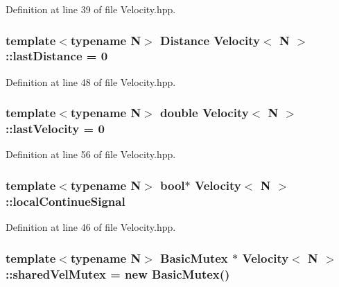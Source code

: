Definition at line 39 of file Velocity.\-hpp.

\hypertarget{struct_velocity_a4a65b272ce588eab6a9a9fa1fdb94a01}{
\subsubsection[{last\-Distance}]{\setlength{\rightskip}{0pt plus 5cm}template$<$typename N$>$ {\bf Distance} {\bf Velocity}$<$ N $>$\-::last\-Distance = 0\hspace{0.3cm}{\ttfamily [protected]}}}\label{struct_velocity_a4a65b272ce588eab6a9a9fa1fdb94a01}


Definition at line 48 of file Velocity.\-hpp.

\hypertarget{struct_velocity_acb312e3b7523314efd771a52fe8f2982}{
\subsubsection[{last\-Velocity}]{\setlength{\rightskip}{0pt plus 5cm}template$<$typename N$>$ double {\bf Velocity}$<$ N $>$\-::last\-Velocity = 0\hspace{0.3cm}{\ttfamily [protected]}}}\label{struct_velocity_acb312e3b7523314efd771a52fe8f2982}


Definition at line 56 of file Velocity.\-hpp.

\hypertarget{struct_velocity_a099e0c3e044ce52e11b1e7ab225f896c}{
\subsubsection[{local\-Continue\-Signal}]{\setlength{\rightskip}{0pt plus 5cm}template$<$typename N$>$ bool$\ast$ {\bf Velocity}$<$ N $>$\-::local\-Continue\-Signal\hspace{0.3cm}{\ttfamily [protected]}}}\label{struct_velocity_a099e0c3e044ce52e11b1e7ab225f896c}


Definition at line 46 of file Velocity.\-hpp.

\hypertarget{struct_velocity_a68112c2f090288d4921a53a21390eac8}{
\subsubsection[{shared\-Vel\-Mutex}]{\setlength{\rightskip}{0pt plus 5cm}template$<$typename N$>$ {\bf Basic\-Mutex} $\ast$ {\bf Velocity}$<$ N $>$\-::shared\-Vel\-Mutex = new {\bf Basic\-Mutex}()\hspace{0.3cm}{\ttfamily [static]}}}\label{struct_velocity_a68112c2f090288d4921a53a21390eac8}


